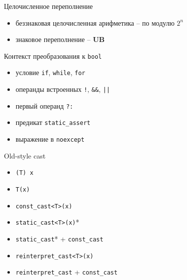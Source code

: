 \documentclass[unknownkeysallowed,xcolor=table]{beamer}
\begin{document}
\begin{frame}{Целочисленное переполнение}
  \begin{itemize}
    \item беззнаковая целочисленная арифметика -- по модулю $2^n$ \vspace{2em}
    \item знаковое переполнение -- \textbf{UB}
  \end{itemize}
\end{frame}

\begin{frame}[fragile]{Контекст преобразования к \lstinline{bool}}
  \begin{itemize}
    \item условие \lstinline{if}, \lstinline{while}, \lstinline{for} \vspace{1em}
    \item операнды встроенных \lstinline{!}, \lstinline{&&}, \lstinline{||} \vspace{1em}
    \item первый операнд \lstinline{?:} \vspace{1em}
    \item предикат \lstinline{static_assert} \vspace{1em}
    \item выражение в \lstinline{noexcept}
  \end{itemize}
\end{frame}

\begin{frame}[fragile]{Old-style cast}
  \begin{minipage}{.45\textwidth}
    \begin{itemize}
      \item \lstinline{(T) x}
      \item \lstinline{T(x)}
    \end{itemize}
  \end{minipage}\hfill
  \begin{minipage}{.45\textwidth}
    \begin{itemize}
      \item \lstinline{const_cast<T>(x)} \vspace{0.5em}
      \item \lstinline{static_cast<T>(x)}* \vspace{0.5em}
      \item \lstinline{static_cast}* + \lstinline{const_cast} \vspace{0.5em}
      \item \lstinline{reinterpret_cast<T>(x)}
      \item \lstinline{reinterpret_cast} + \lstinline{const_cast}
    \end{itemize}
  \end{minipage}
\end{frame}
\end{document}
